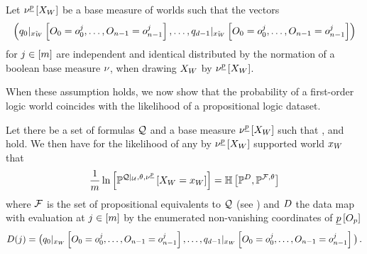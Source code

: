 \begin{assumption}
    \label{ass:independentTuples}
    Let $\nu^{\underline{p}}\left[X_{W}\right]$ be a base measure of worlds such that the vectors
    \begin{align}
        \label{eq:data}
        \left(  {q_{0}}|_{\tilde{x_{W}}} \left[O_{0}=o_{0}^j,\ldots,O_{n-1}=o_{n-1}^j\right], \ldots,
        {q_{d-1}}|_{\tilde{x_{W}}} \left[O_{0}=o_{0}^j,\ldots,O_{n-1}=o_{n-1}^j\right]
        \right)
    \end{align}
    for $j\in[m]$ are independent and identical distributed by the normation of a boolean base measure $\nu$, when drawing $X_{W}$ by $\nu^{\underline{p}}\left[X_{W}\right]$.
\end{assumption}

When these assumption holds, we now show that the probability of a first-order logic world coincides with the likelihood of a propositional logic dataset.

\begin{theorem}
    \label{the:FOLworldToPLdataset}
    Let there be a set of formulas $\mathcal{Q}$ and a base measure $\nu^{\underline{p}}\left[X_{W}\right]$ such that ,  and  hold.
    We then have for the likelihood of any by $\nu^{\underline{p}}\left[X_{W}\right]$ supported world $x_{W}$ that
    \begin{align*}
        \frac{1}{m} \ln \left[ \mathbb{P}^{{\mathcal{Q}}|_{\mathcal{U}},\theta,\nu^{\underline{p}}}\left[X_{W}=x_{W}\right] \right]
        = \mathbb{H}\left[\mathbb{P}^{D},\mathbb{P}^{\mathcal{F},\theta}\right]
    \end{align*}
    where $\mathcal{F}$ is the set of propositional equivalents to $\mathcal{Q}$ (see ) and $D$ the data map with evaluation at $j\in[m]$ by the enumerated non-vanishing coordinates of $\underline{p}\left[O_{p}\right]$
    \begin{align*}
        D(j)
        = \big( {q_{0}}|_{x_{W}} \left[O_{0}=o_{0}^j,\ldots,O_{n-1}=o_{n-1}^j\right], \ldots ,
        {q_{d-1}}|_{x_{W}} \left[O_{0}=o_{0}^j,\ldots,O_{n-1}=o_{n-1}^j\right] \big) \, .
    \end{align*}
\end{theorem}

